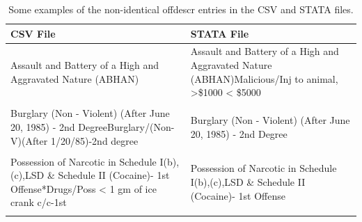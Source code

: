 \documentclass[11pt, oneside]{article}   	%
\newcommand{\rowgroup}[1]{\hspace{-1em}#1}
\theoremstyle{ModifiedStyle}
\begin{document}
\begin{table}[H]
	\centering
	\caption{Some examples of the non-identical offdescr entries in the CSV and STATA files.}
	\vspace{-2mm}
	\setlength\tabcolsep{8pt} %
	{\footnotesize
		\begin{tabular}{L{70mm}L{70mm}}
			\toprule
			CSV File &  STATA File \\
			\midrule
			Assault and Battery of a High and Aggravated Nature (ABHAN) &
			Assault and Battery of a High and Aggravated Nature (ABHAN)Malicious/Inj to animal, >\$1000 < \$5000 \\
			& \\
			Burglary (Non - Violent)  (After June 20, 1985) - 2nd DegreeBurglary/(Non-V)(After 1/20/85)-2nd degree
			& Burglary (Non - Violent)  (After June 20, 1985) - 2nd Degree \\
			& \\
			Possession of Narcotic in Schedule I(b),(c),LSD \& Schedule II (Cocaine)- 1st Offense*Drugs/Poss < 1 gm of ice crank c/c-1st & Possession of Narcotic in Schedule I(b),(c),LSD \& Schedule II (Cocaine)- 1st Offense \\
			& \\
			\bottomrule
		\end{tabular}
	}
	\label{Table_Sentencing_Data_Fields_Offdescr}
\end{table}
\end{document}
